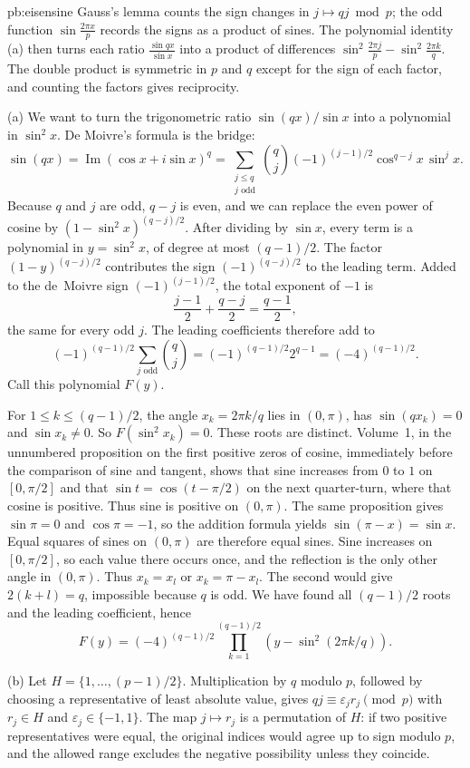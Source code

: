 \begin{solution}{pb:eisensine}
\idea Gauss's lemma counts the sign changes in $j\mapsto qj\bmod p$; the odd function $\sin\frac{2\pi x}p$ records the
signs as a product of sines. The polynomial identity (a) then turns each ratio $\frac{\sin qx}{\sin x}$ into a product of
differences $\sin^2\frac{2\pi j}p-\sin^2\frac{2\pi k}q$. The double product is symmetric in $p$ and $q$ except for the sign
of each factor, and counting the factors gives reciprocity.

\writeup (a) We want to turn the trigonometric ratio $\sin(qx)/\sin x$ into a polynomial in $\sin^2x$. De Moivre's formula is the bridge:
\[
\sin(qx)=\operatorname{Im}(\cos x+i\sin x)^q
=\sum_{\substack{j\le q\\j\text{ odd}}}
\binom qj(-1)^{(j-1)/2}\cos^{q-j}x\,\sin^jx.
\]
Because $q$ and $j$ are odd, $q-j$ is even, and we can replace the even power of cosine by $(1-\sin^2x)^{(q-j)/2}$. After dividing by $\sin x$, every term is a polynomial in $y=\sin^2x$, of degree at most $(q-1)/2$. The factor $(1-y)^{(q-j)/2}$ contributes the sign $(-1)^{(q-j)/2}$ to the leading term. Added to the de~Moivre sign $(-1)^{(j-1)/2}$, the total exponent of $-1$ is
\[
\frac{j-1}2+\frac{q-j}2=\frac{q-1}2,
\]
the same for every odd $j$. The leading coefficients therefore add to
\[
(-1)^{(q-1)/2}
\sum_{j\text{ odd}}\binom qj
=(-1)^{(q-1)/2}2^{q-1}
=(-4)^{(q-1)/2}.
\]
Call this polynomial $F(y)$.

For $1\le k\le(q-1)/2$, the angle $x_k=2\pi k/q$ lies in $(0,\pi)$, has $\sin(qx_k)=0$ and $\sin x_k\ne0$. So $F(\sin^2x_k)=0$. These roots are distinct. Volume~1, in the unnumbered proposition on the first positive zeros of cosine, immediately before the comparison of sine and tangent, shows that sine increases from $0$ to $1$ on $[0,\pi/2]$ and that $\sin t=\cos(t-\pi/2)$ on the next quarter-turn, where that cosine is positive. Thus sine is positive on $(0,\pi)$. The same proposition gives $\sin\pi=0$ and $\cos\pi=-1$, so the addition formula yields $\sin(\pi-x)=\sin x$. Equal squares of sines on $(0,\pi)$ are therefore equal sines. Sine increases on $[0,\pi/2]$, so each value there occurs once, and the reflection is the only other angle in $(0,\pi)$. Thus $x_k=x_l$ or $x_k=\pi-x_l$. The second would give $2(k+l)=q$, impossible because $q$ is odd. We have found all $(q-1)/2$ roots and the leading coefficient, hence
\[
F(y)=(-4)^{(q-1)/2}
\prod_{k=1}^{(q-1)/2}(y-\sin^2(2\pi k/q)).
\]

(b) Let $H=\{1,\ldots,(p-1)/2\}$. Multiplication by $q$ modulo $p$, followed by choosing a representative of least absolute value, gives
$qj\equiv\varepsilon_jr_j\pmod p$ with $r_j\in H$ and $\varepsilon_j\in\{-1,1\}$. The map $j\mapsto r_j$ is a permutation of $H$: if two positive representatives were equal, the original indices would agree up to sign modulo $p$, and the allowed range excludes the negative possibility unless they coincide.


\end{solution}
